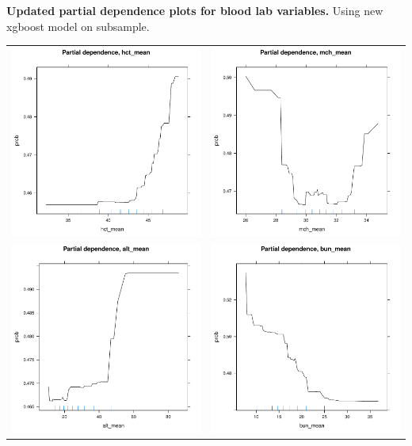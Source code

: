 \documentclass[12pt]{article}
\begin{document}
\textbf{Updated partial dependence plots for blood lab variables.} Using new xgboost model on subsample.
\begin{center}
\begin{tabular}{cc}
\includegraphics[width=.4\textwidth]{pdp_hct2.pdf} &
\includegraphics[width=.4\textwidth]{pdp_mch2.pdf} \\
\includegraphics[width=.4\textwidth]{pdp_alt2.pdf} &
\includegraphics[width=.4\textwidth]{pdp_bun2.pdf} \\
\end{tabular}
\end{center}
\end{document}
